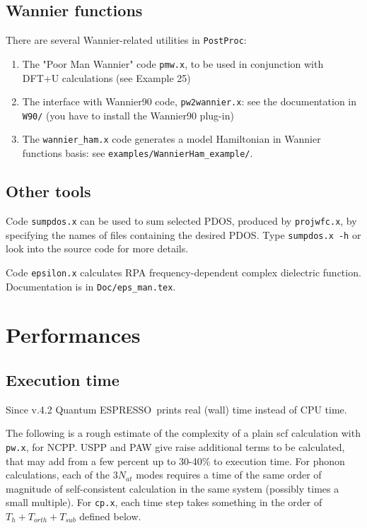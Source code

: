 \documentclass[12pt,a4paper]{article}
\def\qe{{\sc Quantum ESPRESSO}}
\def\pwx{\texttt{pw.x}}
\def\cpx{\texttt{cp.x}}
\def\PostProc{\texttt{PostProc}}
\begin{document}
\subsection{Wannier functions}

There are several Wannier-related utilities in \PostProc:
\begin{enumerate}
\item The "Poor Man Wannier" code \texttt{pmw.x}, to be used
in conjunction with DFT+U calculations (see Example 25)
\item The interface with Wannier90 code, \texttt{pw2wannier.x}:
see the documentation in \texttt{W90/} (you have to install the 
Wannier90 plug-in)
\item The \texttt{wannier\_ham.x} code generates a model Hamiltonian 
in Wannier functions basis: see \texttt{examples/WannierHam\_example/}.
\end{enumerate}

\subsection{Other tools}

Code \texttt{sumpdos.x} can be used to sum selected PDOS, produced by
\texttt{projwfc.x}, by specifying the names of files
containing the desired PDOS. Type \texttt{sumpdos.x -h} or look into the source
code for more details. 

Code \texttt{epsilon.x} calculates RPA frequency-dependent complex dielectric function. Documentation is in \texttt{Doc/eps\_man.tex}.

\section{Performances}

\subsection{Execution time}

Since v.4.2 \qe\ prints real (wall) time instead of CPU time.

The following is a rough estimate of the complexity of a plain
scf calculation with \pwx, for NCPP. USPP and PAW 
give raise additional terms to be calculated, that may add from a 
few percent 
up to 30-40\% to execution time. For phonon calculations, each of the
$3N_{at}$ modes requires a time of the same order of magnitude of
self-consistent calculation in the same system (possibly times a small multiple). 
For \cpx, each time step takes something in the order of
$T_h + T_{orth} + T_{sub}$ defined below.
\end{document}

